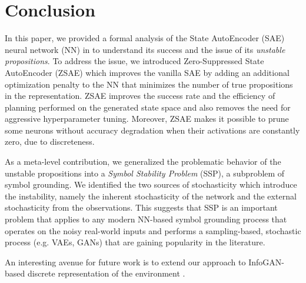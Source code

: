 \section{Conclusion}
\label{conclusion}

In this paper, we provided a formal analysis of the State AutoEncoder
(SAE) neural network (NN) in \latentplanner \cite{Asai2018} to
understand its success and 
the issue of its \emph{unstable propositions}.
% 
To address the issue,
we introduced Zero-Suppressed State AutoEncoder (ZSAE) which
improves the vanilla SAE by
adding an additional optimization penalty to the NN
that minimizes the number of true propositions in the representation.
% 
ZSAE improves the success rate and the efficiency of planning performed on
the generated state space and
also removes the need for aggressive hyperparameter tuning.
% 
Moreover, 
ZSAE makes it possible to prune some neurons without accuracy degradation
when their activations are constantly zero, due to discreteness.

As a meta-level contribution,
we generalized the problematic behavior of the unstable propositions
into a \emph{Symbol Stability Problem} (SSP), a subproblem of symbol grounding.
% 
We identified the two sources of stochasticity which introduce the instability,
namely
the inherent stochasticity of the network and
the external stochasticity from the observations.
% 
This suggests that
SSP is an important problem that applies to any modern NN-based symbol grounding process
that operates on the noisy real-world inputs and
performs a sampling-based, stochastic process (e.g. VAEs, GANs) that are gaining popularity in the literature.
 
An interesting avenue for future work is to extend our approach to InfoGAN-based
discrete representation of the environment \cite{kurutach2018learning}.
